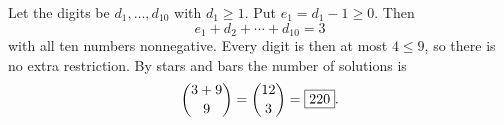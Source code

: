 Let the digits be $d_1,\dots,d_{10}$ with $d_1\ge1$. Put $e_1=d_1-1\ge0$. Then
\[e_1+d_2+\cdots+d_{10}=3\]
with all ten numbers nonnegative. Every digit is then at most $4\le9$, so there is no extra restriction. By stars and bars the number of solutions is
\[\dbinom{3+9}{9}=\dbinom{12}{3}=\boxed{220}.\]
